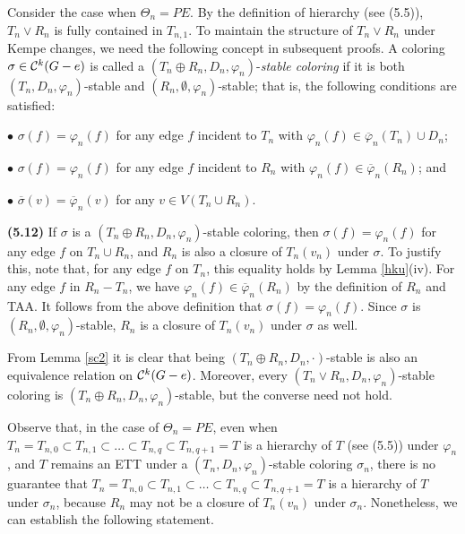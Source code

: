 \documentclass[11pt]{article}
\newcommand{\phibar}{\overline{\varphi}}
\begin{document}
Consider the case when $\Theta_n=PE$. By the definition of hierarchy (see (5.5)), $T_n\vee R_n$ is fully contained
in $T_{n,1}$. To maintain the structure of $T_n\vee R_n$ under Kempe changes, we need the following concept in subsequent proofs.  
A coloring $\sigma \in {\cal C}^k(G-e)$ is called a $(T_n \oplus R_n, D_n,\varphi_n)$-{\em stable coloring}\label{trstable} if it is both $(T_n,D_n,\varphi_n)$-stable and $(R_n,\emptyset,\varphi_n)$-stable; that is, the following conditions are satisfied:

$\bullet$ $\sigma(f)=\varphi_n(f)$ for any edge $f$ incident to $T_n$ with $\varphi_n(f)\in \phibar_n(T_n)\cup D_n$;

$\bullet$ $\sigma(f)=\varphi_n(f)$ for any edge $f$ incident to $R_n$ with $\varphi_n(f)\in\phibar_n(R_n)$; and

$\bullet$ $\overline{\sigma}(v)=\phibar_n(v)$ for any $v\in V(T_n\cup R_n)$.

\vskip 2mm

{\bf (5.12)} If $\sigma$ is a $(T_n \oplus R_n, D_n,\varphi_n)$-stable coloring, then $\sigma(f)=\varphi_n(f)$ for any 
edge $f$ on $T_n \cup R_n$, and $R_n$ is also a closure of $T_n(v_n)$ under $\sigma$. To justify this, note that, for any edge $f$ on $T_n$, 
this equality holds by Lemma \ref{hku}(iv). For any edge $f$ in $R_n -T_n$, we have $\varphi_n(f)\in\phibar_n(R_n)$ by the definition of 
$R_n$ and TAA. It follows from the above definition that $\sigma(f)=\varphi_n(f)$.  Since $\sigma$ is $(R_n,\emptyset,\varphi_n)$-stable, 
$R_n$ is a closure of $T_n(v_n)$ under $\sigma$ as well.

From Lemma \ref{sc2} it is clear that being $(T_n \oplus R_n, D_n,\cdot)$-stable is also an equivalence relation 
on ${\cal C}^k(G-e)$. Moreover, every $(T_n\vee R_n, D_n,\varphi_n)$-stable coloring is $(T_n\oplus R_n,D_n,\varphi_n)$-stable,
but the converse need not hold. 

Observe that, in the case of $\Theta_n=PE$, even when $T_n=T_{n,0}\subset T_{n,1} \subset 	\ldots \subset T_{n,q}\subset T_{n,q+1}=T$ is a 
hierarchy of $T$ (see (5.5)) under $\varphi_n$, and $T$ remains an ETT under a $(T_n, D_n,\varphi_n)$-stable coloring $\sigma_n$, there is
no guarantee that $T_n=T_{n,0}\subset T_{n,1} \subset 	\ldots \subset T_{n,q}\subset T_{n,q+1}=T$ is a hierarchy of $T$ under $\sigma_n$, 
because $R_n$ may not be a closure of $T_n(v_n)$ under $\sigma_n$. Nonetheless, we can establish the following statement.

\setcounter{theorem}{6}
\end{document}
